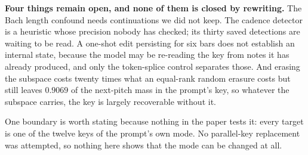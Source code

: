 \documentclass{article}
\begin{document}
\textbf{Four things remain open, and none of them is closed by rewriting.} The Bach
length confound needs continuations we did not keep. The cadence detector is a
heuristic whose precision nobody has checked; its thirty saved detections are waiting
to be read. A one-shot edit persisting for six bars does not establish an internal
state, because the model may be re-reading the key from notes it has already produced,
and only the token-splice control separates those. And erasing the subspace costs
twenty times what an equal-rank random erasure costs but still leaves $0.9069$ of the
next-pitch mass in the prompt's key, so whatever the subspace carries, the key is
largely recoverable without it.

One boundary is worth stating because nothing in the paper tests it: every target is
one of the twelve keys of the prompt's own mode. No parallel-key replacement was attempted,
so nothing here shows that the mode can be changed at all.
\end{document}
